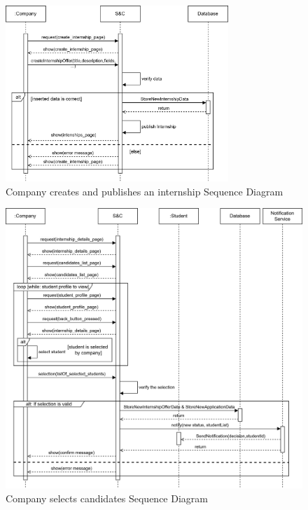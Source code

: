 \begin{figure}[H]
    \centering
    \includegraphics[width=0.75\textwidth]{Images/Sequence_Diagrams/createInt_SD.png}
    \caption{Company creates and publishes an internship Sequence Diagram}
\end{figure}
\begin{figure}[H]
    \centering
    \includegraphics[width=1\textwidth]{Images/Sequence_Diagrams/select_SD.png}
    \caption{Company selects candidates Sequence Diagram}
\end{figure}
